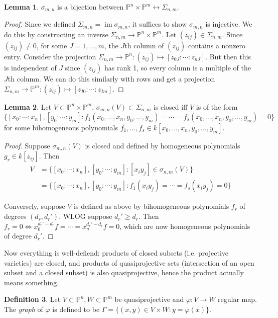 \documentclass{article}
\newcommand{\p}{\mathbb{P}}
\newcommand{\im}{\operatorname{im}}
\theoremstyle{definition}
\newtheorem{defn}{Definition}[subsection]
\newtheorem{lemma}[defn]{Lemma}
\begin{document}
\begin{lemma}
$\sigma_{m,n}$ is a bijection between $\p^n\times\p^m\leftrightarrow\Sigma_{n,m}$.
\end{lemma}
\begin{proof}
Since we defined $\Sigma_{m,n}=\im\sigma_{m,n}$, it suffices to show $\sigma_{m,n}$ is injective. We do this by constructing an inverse $\Sigma_{n,m}\rightarrow\p^n\times\p^m$. Let $(z_{ij})\in\Sigma_{n,m}$. Since $(z_{ij})\neq 0$, for some $J=1,\ldots,m$, the $J$th column of $(z_{ij})$ contains a nonzero entry. Consider the projection $\Sigma_{n,m}\rightarrow\p^n:(z_{ij})\mapsto [z_{0J}:\cdots:z_{nJ}]$. But then this is independent of $J$ since $(z_{ij})$ has rank 1, so every column is a multiple of the $J$th column. We can do this similarly with rows and get a projection $\Sigma_{n,m}\rightarrow\p^m:(z_{ij})\mapsto [z_{I0}:\cdots:z_{Im}]$.
\end{proof}

 \begin{lemma}
Let $V\subset\p^n\times\p^m$. $\sigma_{m,n}(V)\subset\Sigma_{n,m}$ is closed iff $V$ is of the form
\[
\{[x_0:\cdots:x_n],[y_0:\cdots:y_m]:f_1(x_0,\ldots,x_n,y_0,\ldots,y_m)=\cdots=f_s(x_0,\ldots,x_n,y_0,\ldots,y_m)=0\}
\]
for some bihomogeneous polynomials $f_1,\ldots,f_s\in k[x_0,\ldots,x_n,y_0,\ldots,y_m]$.
\end{lemma}
\begin{proof}
Suppose $\sigma_{m,n}(V)$ is closed and defined by homogeneous polynomials $g_r\in k[z_{ij}]$. Then
\[
\begin{aligned}
V&=\{[x_0:\cdots:x_n],[y_0:\cdots:y_m]:[x_iy_j]\in\sigma_{n,m}(V)\} \\
&=\{[x_0:\cdots:x_n],[y_0:\cdots:y_m]:f_1(x_iy_j)=\cdots=f_s(x_iy_j)=0\}
\end{aligned}
\]

Conversely, suppose $V$ is defined as above by bihomogeneous polynomials $f_r$ of degrees $(d_r,d_r')$. WLOG suppose $d_r'\geq d_r$. Then $f_r=0\iff x_0^{d_r'-d_r}f=\cdots=x_n^{d_r'-d_r}f=0$, which are now homogeneous polynomials of degree $d_r'$.
\end{proof}

Now everything is well-defiend: products of closed subsets (i.e. projective varieties) are closed, and products of quasiprojective sets (intersection of an open subset and a closed subset) is also quasiprojective, hence the product actually means something.

\begin{defn}
Let $V\subset\p^n,W\subset\p^m$ be quasiprojective and $\varphi:V\rightarrow W$ regular map. The \textit{graph} of $\varphi$ is defined to be $\Gamma=\{(x,y)\in V\times W:y=\varphi(x)\}$.
\end{defn}
\end{document}
